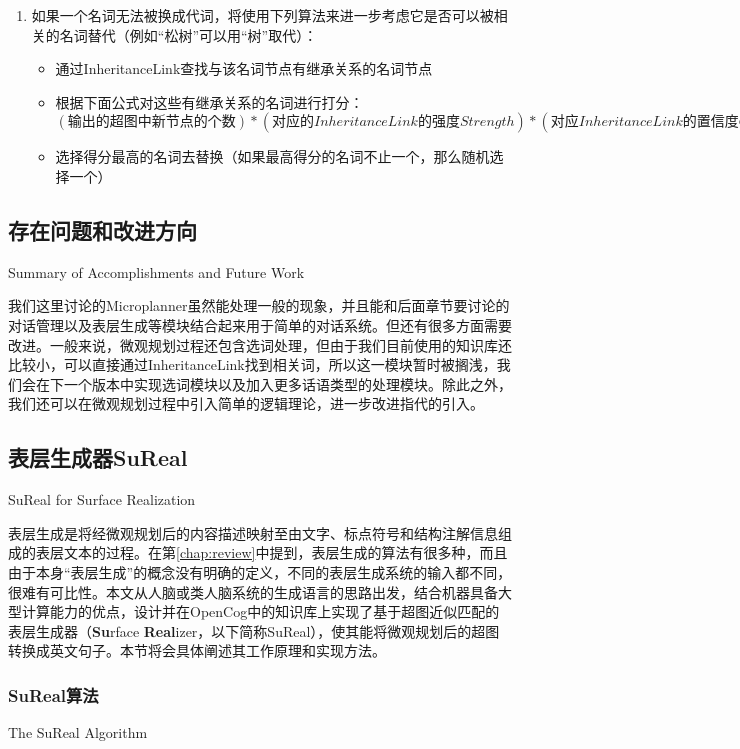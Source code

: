 \begin{enumerate}
\item 如果一个名词无法被换成代词，将使用下列算法来进一步考虑它是否可以被相关的名词替代（例如“松树”可以用“树”取代）：

\begin{itemize}
\item 通过InheritanceLink查找与该名词节点有继承关系的名词节点
\item 根据下面公式对这些有继承关系的名词进行打分：
    $(输出的超图中新节点的个数) * (对应的InheritanceLink的强度Strength) * (对应InheritanceLink的置信度Confidence)$
\item 选择得分最高的名词去替换（如果最高得分的名词不止一个，那么随机选择一个）
\end{itemize}
\end{enumerate}


\subsection{存在问题和改进方向}{Summary of Accomplishments and Future Work}

我们这里讨论的Microplanner虽然能处理一般的现象，并且能和后面章节要讨论的对话管理以及表层生成等模块结合起来用于简单的对话系统。但还有很多方面需要改进。一般来说，微观规划过程还包含选词处理，但由于我们目前使用的知识库还比较小，可以直接通过InheritanceLink找到相关词，所以这一模块暂时被搁浅，我们会在下一个版本中实现选词模块以及加入更多话语类型的处理模块。除此之外，我们还可以在微观规划过程中引入简单的逻辑理论，进一步改进指代的引入。


\subsection{表层生成器SuReal}{SuReal for Surface Realization}

表层生成是将经微观规划后的内容描述映射至由文字、标点符号和结构注解信息组成的表层文本的过程。在第\ref{chap:review}中提到，表层生成的算法有很多种，而且由于本身“表层生成”的概念没有明确的定义，不同的表层生成系统的输入都不同，很难有可比性。本文从人脑或类人脑系统的生成语言的思路出发，结合机器具备大型计算能力的优点，设计并在OpenCog中的知识库上实现了基于超图近似匹配的表层生成器（{\bf Su}rface {\bf Real}izer，以下简称SuReal），使其能将微观规划后的超图转换成英文句子。本节将会具体阐述其工作原理和实现方法。

\subsubsection{SuReal算法}{The SuReal Algorithm}


